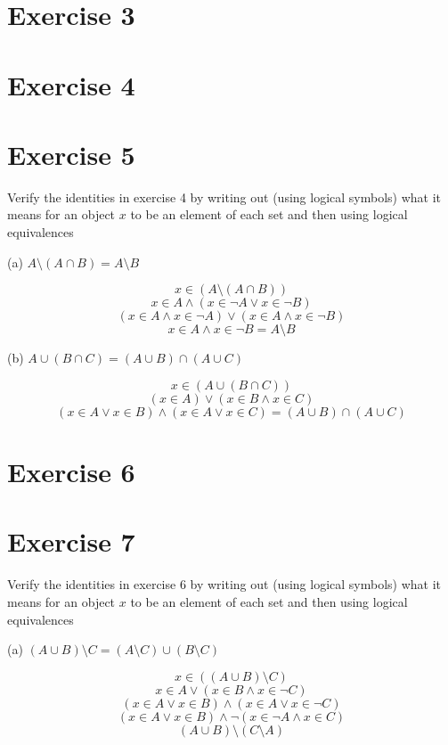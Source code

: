 \documentclass[11pt]{article}
\begin{document}
\section*{Exercise 3}


\section*{Exercise 4}


\section*{Exercise 5}

Verify the identities in exercise 4 by writing out (using logical symbols) what it means for an object $x$ to be an element of each set and then using logical equivalences

\noindent (a) $A \setminus (A \cap B) = A \setminus B$

$$x \in (A \setminus (A \cap B))$$
$$x \in A \wedge (x \in \neg A \vee x \in \neg B)$$
$$(x \in A \wedge x \in \neg A) \vee (x \in A \wedge x \in \neg B)$$
$$x \in A \wedge x \in \neg B = A \setminus B$$

\noindent (b) $A \cup (B \cap C) = (A \cup B) \cap (A \cup C)$

$$x \in (A \cup (B \cap C))$$
$$(x \in A) \vee (x \in B \wedge x \in C)$$
$$(x \in A \vee x \in B) \wedge (x \in A \vee x \in C) = (A \cup B) \cap (A \cup C)$$

\section*{Exercise 6}


\section*{Exercise 7}

Verify the identities in exercise 6 by writing out (using logical symbols) what 
it means for an object $x$ to be an element of each set and then using logical 
equivalences

\noindent (a) $(A \cup B) \setminus C = (A \setminus C) \cup (B \setminus C)$

$$x \in ((A \cup B) \setminus C)$$
$$x \in A \vee (x \in B \wedge x \in \neg C)$$
$$(x \in A \vee x \in B) \wedge (x \in A \vee x \in \neg C)$$
$$(x \in A \vee x \in B) \wedge \neg(x \in \neg A \wedge x \in C)$$
$$(A \cup B) \setminus (C \setminus A)$$
\end{document}
